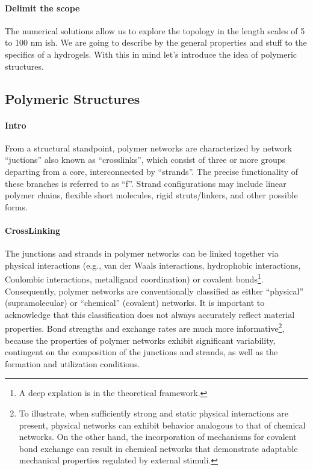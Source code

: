 \paragraph{Delimit the scope} The numerical solutions allow us to explore the topology in the length scales of 5 to 100 nm ish.
We are going to describe by the general properties and stuff to the specifics of a hydrogels.
With this in mind let's introduce the idea of polymeric structures.

\subsection{Polymeric Structures}


\paragraph{Intro} From a structural standpoint, polymer networks are characterized by network ``juctions'' also known as ``crosslinks'', which consist of three or more groups departing from a core, interconnected by ``strands''.
The precise functionality of these branches is referred to as ``f''.
Strand configurations may include linear polymer chains, flexible short molecules, rigid struts/linkers, and other possible forms\citep{guPolymerNetworksPlastics2020}.

\paragraph{CrossLinking} The junctions and strands in polymer networks can be linked together via physical interactions (e.g., van der Waals interactions, hydrophobic interactions, Coulombic interactions, metalligand coordination) or covalent bonds\footnote{A deep explation is in the theoretical framework.}.
Consequently, polymer networks are conventionally classified as either ``physical'' (supramolecular) or ``chemical'' (covalent) networks.
It is important to acknowledge that this classification does not always accurately reflect material properties. 
Bond strengths and exchange rates are much more informative\footnote{To illustrate, when sufficiently strong and static physical interactions are present, physical networks can exhibit behavior analogous to that of chemical networks. 
On the other hand, the incorporation of mechanisms for covalent bond exchange can result in chemical networks that demonstrate adaptable mechanical properties regulated by external stimuli.},
because the properties of polymer networks exhibit significant variability, contingent on the composition of the junctions and strands, as well as the formation and utilization conditions.

